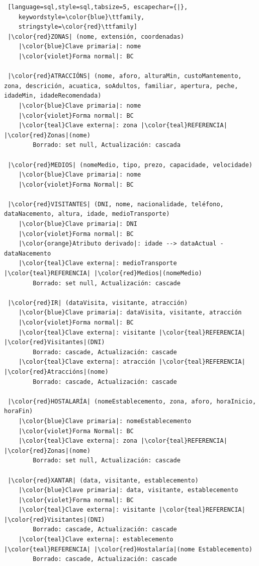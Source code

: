 \documentclass[12pt,a4paper]{book}
\theoremstyle{definition}
\theoremstyle{break}
\begin{document}
\begin{lstlisting} [language=sql,style=sql,tabsize=5, escapechar={|},
	keywordstyle=\color{blue}\ttfamily,
	stringstyle=\color{red}\ttfamily]
 |\color{red}ZONAS| (nome, extensión, coordenadas)
 	|\color{blue}Clave primaria|: nome
 	|\color{violet}Forma normal|: BC
 
 |\color{red}ATRACCIÓNS| (nome, aforo, alturaMin, custoMantemento, zona, descrición, acuatica, soAdultos, familiar, apertura, peche, idadeMin, idadeRecomendada)
 	|\color{blue}Clave primaria|: nome
 	|\color{violet}Forma normal|: BC
 	|\color{teal}Clave externa|: zona |\color{teal}REFERENCIA| |\color{red}Zonas|(nome)
 		Borrado: set null, Actualización: cascada
 		
 |\color{red}MEDIOS| (nomeMedio, tipo, prezo, capacidade, velocidade)
 	|\color{blue}Clave primaria|: nome
 	|\color{violet}Forma Normal|: BC
 
 |\color{red}VISITANTES| (DNI, nome, nacionalidade, teléfono, dataNacemento, altura, idade, medioTransporte) 
 	|\color{blue}Clave primaria|: DNI
 	|\color{violet}Forma normal|: BC
 	|\color{orange}Atributo derivado|: idade --> dataActual - dataNacemento
 	|\color{teal}Clave externa|: medioTransporte |\color{teal}REFERENCIA| |\color{red}Medios|(nomeMedio)
 		Borrado: set null, Actualización: cascade
 
 |\color{red}IR| (dataVisita, visitante, atracción)
 	|\color{blue}Clave primaria|: dataVisita, visitante, atracción
 	|\color{violet}Forma normal|: BC
 	|\color{teal}Clave externa|: visitante |\color{teal}REFERENCIA| |\color{red}Visitantes|(DNI)
 		Borrado: cascade, Actualización: cascade
 	|\color{teal}Clave externa|: atracción |\color{teal}REFERENCIA| |\color{red}Atraccións|(nome)
 		Borrado: cascade, Actualización: cascade
 
 |\color{red}HOSTALARÍA| (nomeEstablecemento, zona, aforo, horaInicio, horaFin)
 	|\color{blue}Clave primaria|: nomeEstablecemento
 	|\color{violet}Forma Normal|: BC
 	|\color{teal}Clave externa|: zona |\color{teal}REFERENCIA| |\color{red}Zonas|(nome)
 		Borrado: set null, Actualización: cascade
 
 |\color{red}XANTAR| (data, visitante, establecemento)
 	|\color{blue}Clave primaria|: data, visitante, establecemento
 	|\color{violet}Forma normal|: BC
 	|\color{teal}Clave externa|: visitante |\color{teal}REFERENCIA| |\color{red}Visitantes|(DNI)
 		Borrado: cascade, Actualización: cascade
 	|\color{teal}Clave externa|: establecemento |\color{teal}REFERENCIA| |\color{red}Hostalaría|(nome Establecemento)
 		Borrado: cascade, Actualización: cascade
 

\end{lstlisting}
\end{document}

